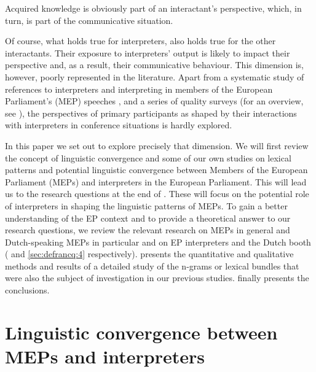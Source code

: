 \documentclass[output=paper]{langscibook}
\begin{document}
Acquired knowledge is obviously part of an interactant’s perspective, which, in turn, is part of the communicative situation. 

Of course, what holds true for interpreters, also holds true for the other interactants. Their exposure to interpreters’ output is likely to impact their perspective and, as a result, their communicative behaviour. This dimension is, however, poorly represented in the literature. Apart from a systematic study of references to interpreters and interpreting in members of the European Parliament’s (MEP) speeches \citep{Bartlomiejczyk2017}, and a series of quality surveys (for an overview, see \citealt{Kurz2001}), the perspectives of primary participants as shaped by their interactions with interpreters in conference situations is hardly explored. 

In this paper we set out to explore precisely that dimension. We will first review the concept of linguistic convergence and some of our own studies on lexical patterns and potential linguistic convergence between Members of the European Parliament (MEPs) and interpreters in the European Parliament. This will lead us to the research questions at the end of . These will focus on the potential role of interpreters in shaping the linguistic patterns of MEPs. To gain a better understanding of the EP context and to provide a theoretical answer to our research questions, we review the relevant research on MEPs in general and Dutch-speaking MEPs in particular and on EP interpreters and the Dutch booth ( and \ref{sec:defrancq:4} respectively).  presents the quantitative and qualitative methods and results of a detailed study of the n-grams or lexical bundles that were also the subject of investigation in our previous studies.  finally presents the conclusions.

\section{Linguistic convergence between MEPs and interpreters}\label{sec:defrancq:2}
\end{document}
